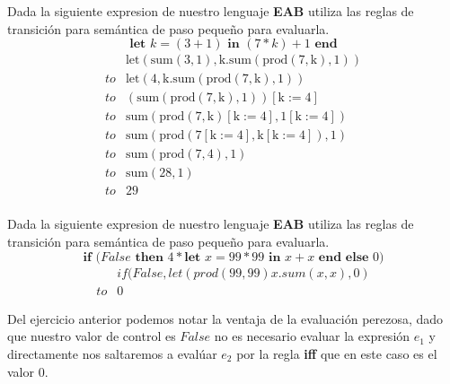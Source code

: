     \bigskip

    \begin{exercise}
        Dada la siguiente expresion de nuestro lenguaje \textbf{EAB} utiliza las reglas de transición para semántica de paso pequeño para evaluarla.
        \[
            \textbf{let } k = (3 + 1) \textbf{ in } (7 * k) + 1 \textbf{ end} 
        \]
        \[
            \begin{array}{cl}
                &\text{let}(\text{sum}(3,1),\text{k}.\text{sum}(\text{prod}(7,\text{k}),1))\\
                to&\text{let}(4,\text{k}.\text{sum}(\text{prod}(7,\text{k}),1))\\
                to&(\text{sum}(\text{prod}(7,\text{k}),1))[\text{k}:=4]\\
                to&\text{sum}(\text{prod}(7,\text{k})[\text{k}:=4],1[\text{k}:=4])\\
                to&\text{sum}(\text{prod}(7[\text{k}:=4],\text{k}[\text{k}:=4]),1)\\
                to&\text{sum}(\text{prod}(7,4),1)\\
                to&\text{sum}(28,1)\\
                to&29\\
                

            \end{array}
        \]
        
    \end{exercise}

    \bigskip

    \begin{exercise}
        Dada la siguiente expresion de nuestro lenguaje \textbf{EAB} utiliza las reglas de transición para semántica de paso pequeño para evaluarla.
        \[
            \textbf{if (} False \textbf{ then } 4 * \textbf{let } x = 99 * 99 \textbf{ in } x + x \textbf{ end} \textbf{ else } 0 \textbf{)}
        \] 
        \[
            \begin{array}{cl}
                &if(False,let(prod(99,99)x.sum(x,x),0)\\
                to&0

            \end{array}
        \]
    \end{exercise}

    Del ejercicio anterior podemos notar la ventaja de la evaluación perezosa, dado que nuestro valor de control es $False$ no es necesario evaluar la expresión $e_1$ y directamente nos saltaremos a evalúar $e_2$ por la regla \textbf{iff} que en este caso es el valor 0.\\
    
